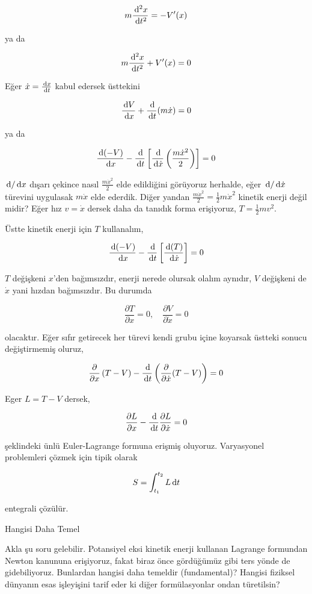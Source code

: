 \documentclass[12pt,fleqn]{article}\usepackage{../../common}
\begin{document}
$$
m \frac{\,\mathrm{d}^2 x}{\,\mathrm{d} t^2} = -V'(x)
$$

ya da

$$
m \frac{\,\mathrm{d}^2 x}{\,\mathrm{d} t^2} + V'(x) = 0
$$

Eğer $\dot{x} = \frac{\,\mathrm{d} x}{\,\mathrm{d} t}$ kabul edersek üsttekini

$$
\frac{\,\mathrm{d} V}{\,\mathrm{d} x} + \frac{\,\mathrm{d}}{\,\mathrm{d} t} (m\dot{x}) = 0
$$

ya da

$$
\frac{\,\mathrm{d} (-V)}{\,\mathrm{d} x} -
\frac{\,\mathrm{d}}{\,\mathrm{d} t}
  \left[
     \frac{\,\mathrm{d} }{\,\mathrm{d} \dot{x}} \left( \frac{m\dot{x}^2}{2} \right)
  \right] =0 
$$

$\,\mathrm{d} / \,\mathrm{d} x$ dışarı çekince nasıl $\frac{m\dot{x}^2}{2}$ elde edildiğini
görüyoruz herhalde, eğer $\,\mathrm{d} / \,\mathrm{d} \dot{x}$ türevini uygulasak $m\dot{x}$
elde ederdik. Diğer yandan $\frac{m\dot{x}^2}{2} = \frac{1}{2} m\dot{x}^2$
kinetik enerji değil midir? Eğer hız $v = \dot{x}$ dersek daha da tanıdık
forma erişiyoruz, $T = \frac{1}{2} mv^2$.

Üstte kinetik enerji için $T$ kullanalım,
  
$$
\frac{\,\mathrm{d} (-V)}{\,\mathrm{d} x} -
\frac{\,\mathrm{d}}{\,\mathrm{d} t}
  \left[ \frac{\,\mathrm{d} (T)}{\,\mathrm{d} \dot{x}} \right] =0 
$$


$T$ değişkeni $x$'den bağımsızdır, enerji nerede olursak olalım aynıdır, $V$
değişkeni de $\dot{x}$ yani hızdan bağımsızdır. Bu durumda

$$
\frac{\partial T}{\partial x} = 0, \quad
\frac{\partial V}{\partial \dot{x}} = 0
$$

olacaktır. Eğer sıfır getirecek her türevi kendi grubu içine koyarsak üstteki
sonucu değiştirmemiş oluruz,

$$
\frac{\partial }{\partial x} \left( T - V  \right) -
\frac{\,\mathrm{d}}{\,\mathrm{d} t} \left( \frac{\partial }{\partial \dot{x}} (T - V)  \right) = 0
$$

Eger $L = T - V$ dersek,

$$
\frac{\partial L}{\partial x} - \frac{\,\mathrm{d}}{\,\mathrm{d} t} \frac{\partial L}{\partial \dot{x}} = 0
$$

şeklindeki ünlü Euler-Lagrange formuna erişmiş oluyoruz. Varyasyonel problemleri
çözmek için tipik olarak

$$
S = \int_{t_1}^{t_2} L \,\mathrm{d} t
$$

entegrali çözülür.

Hangisi Daha Temel

Akla şu soru gelebilir. Potansiyel eksi kinetik enerji kullanan Lagrange
formundan Newton kanununa erişiyoruz, fakat biraz önce gördüğümüz gibi ters
yönde de gidebiliyoruz. Bunlardan hangisi daha temeldir (fundamental)? Hangisi
fiziksel dünyanın esas işleyişini tarif eder ki diğer formülasyonlar ondan
türetilsin?
\end{document}
